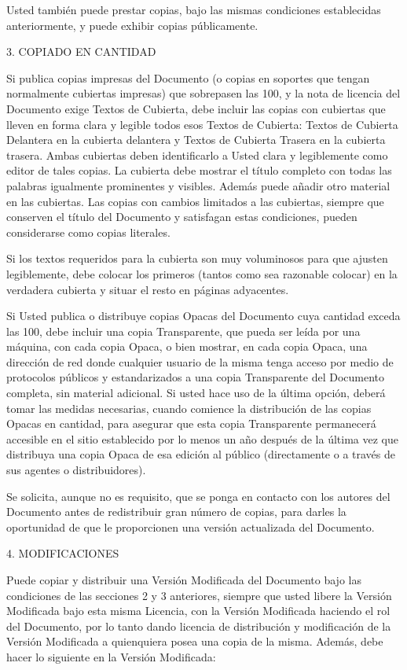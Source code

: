\documentclass[a4paper, 11pt, oneside]{report}
\begin{document}
Usted también puede prestar copias, bajo las mismas condiciones establecidas anteriormente, y puede exhibir copias públicamente.

3. COPIADO EN CANTIDAD

Si publica copias impresas del Documento (o copias en soportes que tengan normalmente cubiertas impresas) que sobrepasen las 100, y la nota de licencia del Documento exige Textos de Cubierta, debe incluir las copias con cubiertas que lleven en forma clara y legible todos esos Textos de Cubierta: Textos de Cubierta Delantera en la cubierta delantera y Textos de Cubierta Trasera en la cubierta trasera. Ambas cubiertas deben identificarlo a Usted clara y legiblemente como editor de tales copias. La cubierta debe mostrar el título completo con todas las palabras igualmente prominentes y visibles. Además puede añadir otro material en las cubiertas. Las copias con cambios limitados a las cubiertas, siempre que conserven el título del Documento y satisfagan estas condiciones, pueden considerarse como copias literales.

Si los textos requeridos para la cubierta son muy voluminosos para que ajusten legiblemente, debe colocar los primeros (tantos como sea razonable colocar) en la verdadera cubierta y situar el resto en páginas adyacentes.

Si Usted publica o distribuye copias Opacas del Documento cuya cantidad exceda las 100, debe incluir una copia Transparente, que pueda ser leída por una máquina, con cada copia Opaca, o bien mostrar, en cada copia Opaca, una dirección de red donde cualquier usuario de la misma tenga acceso por medio de protocolos públicos y estandarizados a una copia Transparente del Documento completa, sin material adicional. Si usted hace uso de la última opción, deberá tomar las medidas necesarias, cuando comience la distribución de las copias Opacas en cantidad, para asegurar que esta copia Transparente permanecerá accesible en el sitio establecido por lo menos un año después de la última vez que distribuya una copia Opaca de esa edición al público (directamente o a través de sus agentes o distribuidores).

Se solicita, aunque no es requisito, que se ponga en contacto con los autores del Documento antes de redistribuir gran número de copias, para darles la oportunidad de que le proporcionen una versión actualizada del Documento.

4. MODIFICACIONES

Puede copiar y distribuir una Versión Modificada del Documento bajo las condiciones de las secciones 2 y 3 anteriores, siempre que usted libere la Versión Modificada bajo esta misma Licencia, con la Versión Modificada haciendo el rol del Documento, por lo tanto dando licencia de distribución y modificación de la Versión Modificada a quienquiera posea una copia de la misma. Además, debe hacer lo siguiente en la Versión Modificada:
\end{document}

